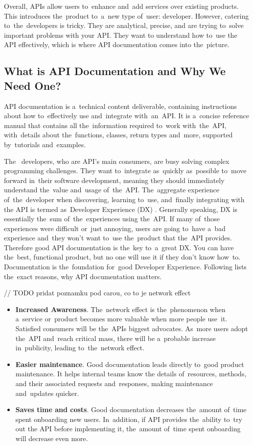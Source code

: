 Overall, APIs allow users to~enhance and~add services over existing products.
This introduces the~product to~a~new type of~user: 
developer. However, catering to~the~developers is tricky. They are analytical,
precise, and are trying to~solve important problems with your API. They want to
understand how to~use the API effectively, which is where API documentation
comes into the~picture.

\subsection{What is API Documentation and Why We Need One?}
API documentation is a~technical content deliverable, containing instructions
about how to~effectively use and~integrate with~an~API. It is a~concise
reference manual that contains all the~information required to~work
with~the~API, with~details about the~functions, classes, return types and~more,
supported by~tutorials and~examples. 

The~ developers, who are API's main consumers, are busy solving
complex programming challenges. They want to~integrate as~quickly as~possible to~move forward in~their
software development, meaning they should immediately understand the~value
and~usage of~the~API. The~aggregate experience of~the~developer when
discovering, learning to~use, and~finally integrating with the API is termed
as~Developer Experience (DX) \cite{practical-api}.  Generally speaking, DX is
essentially the~sum of~the~experiences using the~API. If many of~those experiences were difficult
or~just annoying, users are going to~have a~bad experience and~they won't want
to~use the~product that the~API provides. Therefore good API documentation is
the~key to~a~great DX. You can have the~best, functional product, but no one
will use it if they don't know how~to. Documentation is the~foundation for~good
Developer Experience. Following lists the~exact reasons, why API documentation
matters.

// TODO pridat poznamku pod carou, co to je network effect
\begin{itemize}
  \item \textbf{Increased Awareness}. The~network effect is the~phenomenon when
  a~service or~product becomes more valuable when more people use~it. Satisfied
  consumers will be the~APIs biggest advocates. As~more users adopt the~API
  and~reach critical mass, there will be a~probable increase in~publicity,
  leading to~the~network effect. 
  \item \textbf{Easier maintenance}. Good documentation leads directly to~good
  product maintenance. It helps internal teams know the details of~resources,
  methods, and their associated requests and~responses, making maintenance
  and~updates quicker.
  \item \textbf{Saves time and costs}. Good documentation decreases
  the~amount of~time spent onboarding new users. In~addition, if API provides
  the~ability to~try out the API before implementing it, the~amount of~time
  spent onboarding will decrease even more.
\end{itemize}

